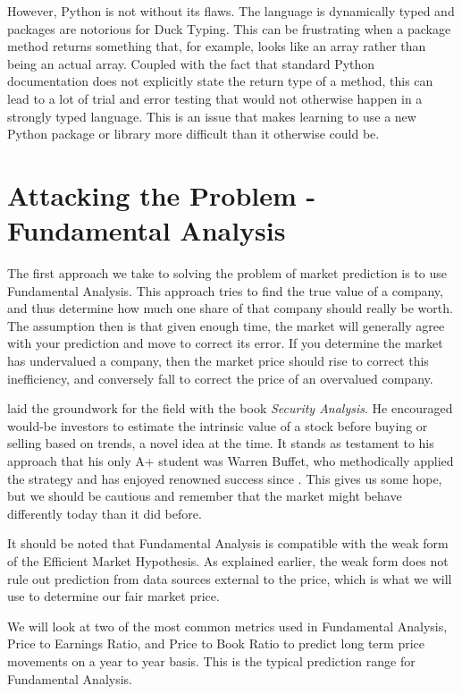 \documentclass{report}
\begin{document}
However, Python is not without its flaws. The language is dynamically typed and packages are notorious for Duck Typing. This can be frustrating when a package method returns something that, for example, looks like an array rather than being an actual array. Coupled with the fact that standard Python documentation does not explicitly state the return type of a method, this can lead to a lot of trial and error testing that would not otherwise happen in a strongly typed language. This is an issue that makes learning to use a new Python package or library more difficult than it otherwise could be.


\chapter{Attacking the Problem - Fundamental Analysis}

The first approach we take to solving the problem of market prediction is to use Fundamental Analysis. This approach tries to find the true value of a company, and thus determine how much one share of that company should really be worth. The assumption then is that given enough time, the market will generally agree with your prediction and move to correct its error. If you determine the market has undervalued a company, then the market price should rise to correct this inefficiency, and conversely fall to correct the price of an overvalued company. 

\citet{graham1934security} laid the groundwork for the field with the book \textit{Security Analysis}. He encouraged would-be investors to estimate the intrinsic value of a stock before buying or selling based on trends, a novel idea at the time. It stands as testament to his approach that his only A+ student was Warren Buffet, who methodically applied the strategy and has enjoyed renowned success since \cite{schroeder2008snowball}. This gives us some hope, but we should be cautious and remember that the market might behave differently today than it did before.

It should be noted that Fundamental Analysis is compatible with the weak form of the Efficient Market Hypothesis. As explained earlier, the weak form does not rule out prediction from data sources external to the price, which is what we will use to determine our fair market price.

We will look at two of the most common metrics used in Fundamental Analysis, Price to Earnings Ratio, and Price to Book Ratio to predict long term price movements on a year to year basis. This is the typical prediction range for Fundamental Analysis.
\end{document}
